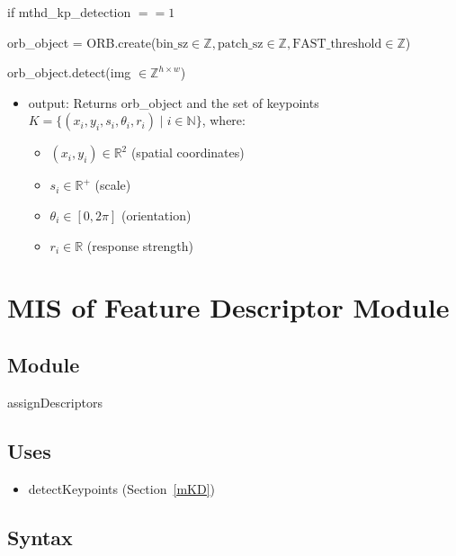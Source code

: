\documentclass[12pt, titlepage]{article}
\begin{document}
if mthd\_kp\_detection $== 1$ \newline

orb\_object = ORB.create($\text{bin\_sz}\in \mathbb{Z}, \text{patch\_sz}\in 
\mathbb{Z}, \text{FAST\_threshold} \in \mathbb{Z}$) \newline

orb\_object.detect(img $\in \mathbb{Z}^{h \times w}$)
\begin{itemize}
  \item output: Returns orb\_object and the set of keypoints \(K = \{ (x_i, y_i, s_i, \theta_i, r_i) 
  \mid i \in \mathbb{N} \} \), where:
  \begin{itemize}
      \item \( (x_i, y_i) \in \mathbb{R}^2 \) (spatial coordinates)
      \item \( s_i \in \mathbb{R}^+ \) (scale)
      \item \( \theta_i \in [0, 2\pi] \) (orientation)
      \item \( r_i \in \mathbb{R} \) (response strength)
  \end{itemize}
\end{itemize}



\section{MIS of Feature Descriptor Module} \label{mFD}



\subsection{Module}

assignDescriptors

\subsection{Uses}
\begin{itemize}
  \item detectKeypoints (Section~\ref{mKD})
\end{itemize}

\subsection{Syntax}
\end{document}
